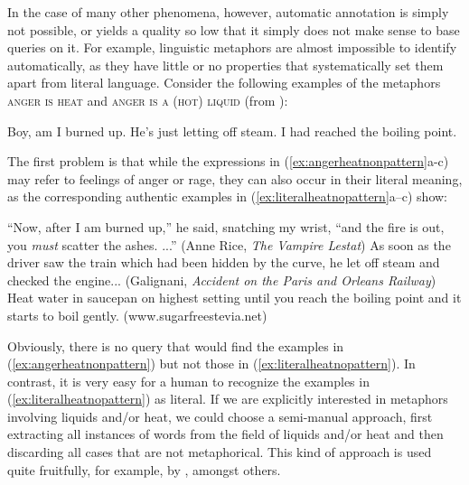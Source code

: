In the case of many other phenomena, however, automatic annotation  is simply not possible, or yields a quality so low that it simply does not make sense to base queries  on it. For example, linguistic metaphors  are almost impossible to identify automatically, as they have little or no properties that systematically set them apart from literal  language. Consider the following examples of the metaphors \textsc{anger  is heat} and \textsc{anger is a (hot) liquid} (from \citealt[203]{lakoff_cognitive_1987}):

\begin{exe}
\ex
\begin{xlist}
\label{ex:angerheatnonpattern}
\ex Boy, am I burned up.
\ex He's just letting off steam.
\ex I had reached the boiling point.
\end{xlist}
\end{exe}

The first problem is that while the expressions in (\ref{ex:angerheatnonpattern}a-c) may refer to feelings  of anger or rage, they can also occur in their literal  meaning, as the corresponding authentic  examples in (\ref{ex:literalheatnopattern}a--c) show:

\begin{exe}
\ex
\begin{xlist}
\label{ex:literalheatnopattern}
\ex ``Now, after I am burned up,'' he said, snatching my wrist, ``and the fire is out, you \textit{must} scatter the ashes. ...'' (Anne Rice, \textit{The Vampire Lestat})
\ex As soon as the driver saw the train which had been hidden by the curve, he let off steam and checked the engine... (Galignani, \textit{Accident on the Paris and Orleans Railway})
\ex Heat water in saucepan on highest setting until you reach the boiling point and it starts to boil gently. (www.sugarfreestevia.net)
\end{xlist}
\end{exe}

Obviously, there is no query  that would find the examples in (\ref{ex:angerheatnonpattern})  but not those in (\ref{ex:literalheatnopattern}). In contrast, it is very easy for a human to recognize the examples in (\ref{ex:literalheatnopattern}) as literal.  If we are explicitly interested in metaphors  involving liquids and\slash or heat, we could choose a semi\hyp{}manual  approach, first extracting  all instances of words from the field of liquids and\slash or heat and then discarding all cases that are not metaphorical. This kind of approach is used quite fruitfully, for example, by \citet{deignan_metaphor_2005}, amongst others.

